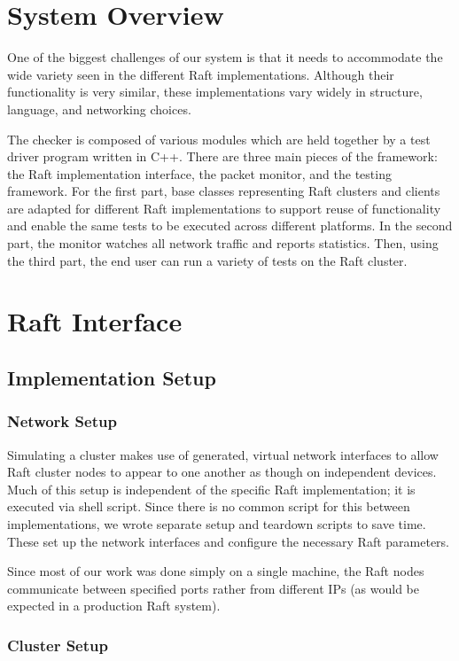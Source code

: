 \documentclass[UTF8]{article}
\begin{document}
\section{System Overview}
One of the biggest challenges of our system is that it needs to accommodate the wide variety seen in the different Raft implementations. Although their functionality is very similar, these implementations vary widely in structure, language, and networking choices.

The checker is composed of various modules which are held together by a test driver program written in C++. There are three main pieces of the framework: the Raft implementation interface, the packet monitor, and the testing framework. For the first part, base classes representing Raft clusters and clients are adapted for different Raft implementations to support reuse of functionality and enable the same tests to be executed across different platforms. In the second part, the monitor watches all network traffic and reports statistics. Then, using the third part, the end user can run a variety of tests on the Raft cluster.

\section{Raft Interface}

\subsection{Implementation Setup}

\subsubsection{Network Setup}

Simulating a cluster makes use of generated, virtual network interfaces to allow Raft cluster nodes to appear to one another as though on independent devices. Much of this setup is independent of the specific Raft implementation; it is executed via shell script. Since there is no common script for this between implementations, we wrote separate setup and teardown scripts to save time. These set up the network interfaces and configure the necessary Raft parameters.

Since most of our work was done simply on a single machine, the Raft nodes communicate between specified ports rather from different IPs (as would be expected in a production Raft system).

\subsubsection{Cluster Setup}
\end{document}
